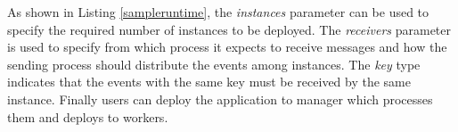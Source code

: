 


As shown in Listing \ref{sampleruntime}, the \textit{instances} parameter can be used to specify the required number of instances to be deployed. The \textit{receivers} parameter is used to specify from which process it expects to receive messages and how the sending process should distribute the events among instances. The \textit{key} type indicates that the events with the same key must be received by the same instance. Finally users can deploy the application to manager which processes them and deploys to workers.






 
